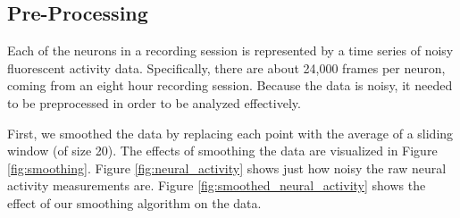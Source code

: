 \documentclass{article}
\begin{document}
\subsection{Pre-Processing}
\label{sec:data}

Each of the neurons in a recording session is represented by a time series of 
noisy fluorescent activity data. Specifically, there are about 24,000 frames 
per neuron, coming from an eight hour recording session. Because the data is 
noisy, it needed to be preprocessed in order to be analyzed effectively.\par

First, we smoothed the data by replacing each point with the average of a 
sliding window (of size 20). The effects of smoothing the data are visualized 
in Figure \ref{fig:smoothing}. Figure \ref{fig:neural_activity} shows just how 
noisy the raw neural activity measurements are. Figure 
\ref{fig:smoothed_neural_activity} shows the effect of our smoothing algorithm
on the data. \par
 
\end{document}
